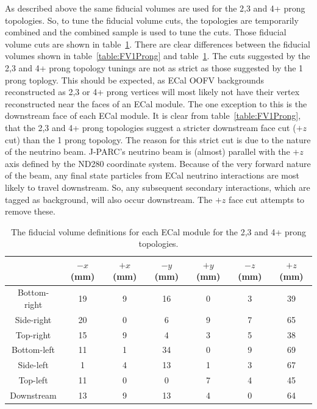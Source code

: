 As described above the same fiducial volumes are used for the 2,3 and 4+ prong topologies.  So, to tune the fiducial volume cuts, the topologies are temporarily combined and the combined sample is used to tune the cuts.  Those fiducial volume cuts are shown in table~\ref{table:FV2+Prong}.  There are clear differences between the fiducial volumes shown in table~\ref{table:FV1Prong} and table~\ref{table:FV2+Prong}.  The cuts suggested by the 2,3 and 4+ prong topology tunings are not as strict as those suggested by the 1 prong toplogy.  This should be expected, as ECal OOFV backgrounds reconstructed as 2,3 or 4+ prong vertices will most likely not have their vertex reconstructed near the faces of an ECal module.  The one exception to this is the downstream face of each ECal module.  It is clear from table~\ref{table:FV1Prong}, that the 2,3 and 4+ prong topologies suggest a stricter downstream face cut ($+z$ cut) than the 1 prong topology.  The reason for this strict cut is due to the nature of the neutrino beam.  J-PARC's neutrino beam is (almost) parallel with the $+z$ axis defined by the ND280 coordinate system.  Because of the very forward nature of the beam, any final state particles from ECal neutrino interactions are most likely to travel downstream.  So, any subsequent secondary interactions, which are tagged as background, will also occur downstream.  The $+z$ face cut attempts to remove these.
\begin{table}
  \begin{tabular}{ c c c c c c c }
     & $-x$ (mm) & $+x$ (mm) & $-y$ (mm) & $+y$ (mm) & $-z$ (mm) & $+z$ (mm)  \\ \hline \hline
    Bottom-right & 19 & 9 & 16 & 0 & 3 & 39 \\
    Side-right & 20 & 0 & 6 & 9 & 7 & 65 \\
    Top-right & 15 & 9 & 4 & 3 & 5 & 38 \\
    Bottom-left & 11 & 1 & 34 & 0 & 9 & 69 \\
    Side-left & 1 & 4 & 13 & 1 & 3 & 67 \\
    Top-left & 11 & 0 & 0 & 7 & 4 & 45 \\
    Downstream & 13 & 9 & 13 & 4 & 0 & 64  \\
  \end{tabular}
  \caption{The fiducial volume definitions for each ECal module for the 2,3 and 4+ prong topologies.}
  \label{table:FV2+Prong}
\end{table}
